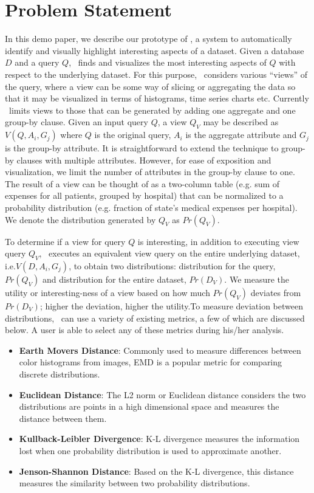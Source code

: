 \section{Problem Statement}
\label{sec:problem_statement}

In this demo paper, we describe our prototype of \SeeDB, a system to
automatically identify and visually highlight interesting aspects of a dataset.
Given a database $D$ and a query $Q$, \SeeDB\ finds and visualizes the most
interesting aspects of $Q$ with respect to the underlying dataset. For this
purpose, \SeeDB\ considers various ``views'' of the query, where a view can be
some way of slicing or aggregating the data so that it may be visualized in
terms of histograms, time series charts etc. Currently \SeeDB\ limits views to
those that can be generated by adding one aggregate and one group-by clause.
Given an input query $Q$, a view $Q_V$ may be described as $V(Q, A_i, G_j)$
where $Q$ is the original query, $A_i$ is the aggregate attribute and $G_j$ is
the group-by attribute. It is straightforward to extend the technique to
group-by clauses with multiple attributes. However, for ease of exposition and
visualization, we limit the number of attributes in the group-by clause to one.
The result of a view can be thought of as a two-column table (e.g. sum of
expenses for all patients, grouped by hospital) that can be
normalized to a probability distribution (e.g. fraction of state's medical
expenses per hospital). We denote the distribution generated by $Q_V$
as $Pr(Q_V)$.

To determine if a view for query $Q$ is interesting, in addition to executing
view query $Q_V$, \SeeDB\ executes an equivalent view query on the entire
underlying dataset, i.e.$V(D, A_i, G_j)$, to obtain two distributions:
distribution for the query, $Pr(Q_V)$ and distribution for the entire
dataset, $Pr(D_V)$. We measure the utility or interesting-ness of a view based on how
much $Pr(Q_V)$ deviates from $Pr(D_V)$; higher the deviation, higher the
utility.To measure deviation between distributions, \SeeDB\ can use a variety of
existing metrics, a few of which are discussed below. A user is able to select
any of these metrics during his/her analysis.

\begin{itemize}
  \item {\bf Earth Movers Distance}: Commonly used to measure differences
  between color histograms from images, EMD is a popular metric for comparing
  discrete distributions.
  \item {\bf Euclidean Distance}: The L2 norm or Euclidean distance considers
  the two distributions are points in a high dimensional space and measures the
  distance between them.
  \item {\bf Kullback-Leibler Divergence}: K-L divergence measures the
  information lost when one probability distribution is used to approximate
  another.
  \item {\bf Jenson-Shannon Distance}: Based on the K-L divergence, this
  distance measures the similarity between two probability distributions.
\end{itemize}


